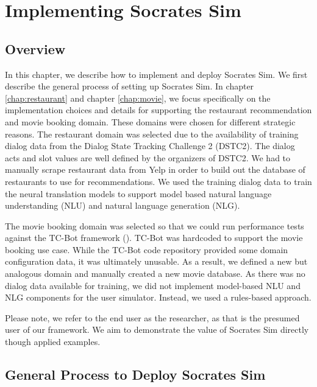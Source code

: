 \chapter{Implementing Socrates Sim}
\label{chap:implementation}

\section{Overview}

In this chapter, we describe how to implement and deploy Socrates Sim. We first describe the general process of setting up Socrates Sim. In chapter \ref{chap:restaurant} and chapter \ref{chap:movie}, we focus specifically on the implementation choices and details for supporting the restaurant recommendation and movie booking domain. These domains were chosen for different strategic reasons. The restaurant domain was selected due to the availability of training dialog data from the Dialog State Tracking Challenge 2 (DSTC2). The dialog acts and slot values are well defined by the organizers of DSTC2. We had to manually scrape restaurant data from Yelp in order to build out the database of restaurants to use for recommendations. We used the training dialog data to train the neural translation models to support model based natural language understanding (NLU) and natural language generation (NLG). 

 The movie booking domain was selected so that we could run performance tests against the TC-Bot framework (\cite{li_end_to_end}). TC-Bot was hardcoded to support the movie booking use case. While the TC-Bot code repository provided some domain configuration data, it was ultimately unusable. As a result, we defined a new but analogous domain and manually created a new movie database. As there was no dialog data available for training, we did not implement model-based NLU and NLG components for the user simulator. Instead, we used a rules-based approach. 
 
Please note, we refer to the end user as the researcher, as that is the presumed user of our framework. We aim to demonstrate the value of Socrates Sim directly though applied examples. 

\section{General Process to Deploy Socrates Sim}

